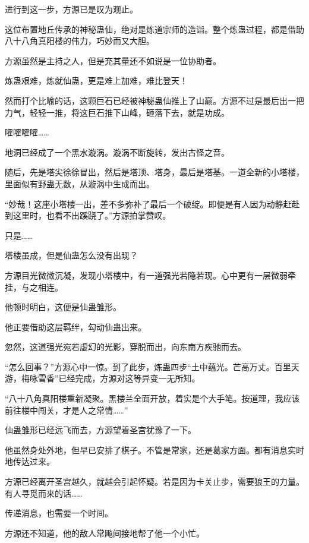 
\begin{this_body}

进行到这一步，方源已是叹为观止。

这位布置地丘传承的神秘蛊仙，绝对是炼道宗师的造诣。整个炼蛊过程，都是借助八十八角真阳楼的伟力，巧妙而又大胆。

方源虽然是主持之人，但是充其量还不如说是一位协助者。

炼蛊艰难，炼就仙蛊，更是难上加难，难比登天！

然而打个比喻的话，这颗巨石已经被神秘蛊仙推上了山巅。方源不过是最后出一把力气，轻轻一推，将这巨石推下山峰，砸落下去，就是功成。

嚯嚯嚯嚯……

地洞已经成了一个黑水漩涡。漩涡不断旋转，发出古怪之音。

随后，先是塔尖徐徐冒出，然后是塔顶、塔身，最后是塔基。一道全新的小塔楼，里面似有野蛊无数，从漩涡中生成而出。

“妙哉！这座小塔楼一出，差不多弥补了最后一个破绽。即便是有人因为动静赶赴到这里时，也看不出蹊跷了。”方源拍掌赞叹。

只是……

塔楼虽成，但是仙蛊怎么没有出现？

方源目光微微沉凝，发现小塔楼中，有一道强光若隐若现。心中更有一层微弱牵挂，与之相连。

他顿时明白，这便是仙蛊雏形。

他正要借助这层羁绊，勾动仙蛊出来。

忽然，这道强光宛若虚幻的光影，穿脱而出，向东南方疾驰而去。

“怎么回事？”方源心中一惊。到了此步，炼蛊四步“土中蕴光。芒高万丈。百里天游，梅咏雪香”已经完成，方源对这等异变一无所知。

“八十八角真阳楼重新凝聚。黑楼兰全面开放，着实是个大手笔。按道理，我应该前往楼中闯关，才是人之常情……”

仙蛊雏形已经远飞而去，方源望着圣宫犹豫了一下。

他虽然身处外地，但早已安排了棋子。不管是常家，还是葛家方面。都有消息实时地传达过来。

方源已经离开圣宫越久，就越会引起怀疑。若是因为卡关止步，需要狼王的力量。有人寻觅而来的话……

传递消息，也需要一个时间。

方源还不知道，他的敌人常飚间接地帮了他一个小忙。


\end{this_body}
